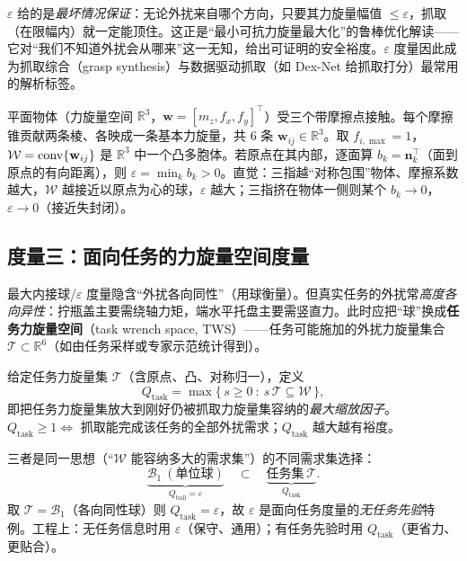 \begin{insight}
$\varepsilon$ 给的是\emph{最坏情况保证}：无论外扰来自哪个方向，只要其力旋量幅值 $\le\varepsilon$，抓取（在限幅内）就一定能顶住。这正是“最小可抗力旋量最大化”的鲁棒优化解读——它对“我们不知道外扰会从哪来”这一无知，给出可证明的安全裕度。$\varepsilon$ 度量因此成为抓取综合（grasp synthesis）与数据驱动抓取（如 Dex-Net 给抓取打分）最常用的解析标签。
\end{insight}

\begin{example}\label{ex:gp-epsilon-2d}
平面物体（力旋量空间 $\mathbb{R}^3$，$\mathbf{w}=[m_z,f_x,f_y]^\top$）受三个带摩擦点接触。每个摩擦锥贡献两条棱、各映成一条基本力旋量，共 $6$ 条 $\mathbf{w}_{ij}\in\mathbb{R}^3$。取 $f_{i,\max}=1$，$\mathcal{W}=\operatorname{conv}\{\mathbf{w}_{ij}\}$ 是 $\mathbb{R}^3$ 中一个凸多胞体。若原点在其内部，逐面算 $b_k=\mathbf{n}_k^\top$（面到原点的有向距离），则 $\varepsilon=\min_k b_k>0$。直觉：三指越“对称包围”物体、摩擦系数越大，$\mathcal{W}$ 越接近以原点为心的球，$\varepsilon$ 越大；三指挤在物体一侧则某个 $b_k\to 0$，$\varepsilon\to 0$（接近失封闭）。
\end{example}

\subsection{度量三：面向任务的力旋量空间度量}
最大内接球/$\varepsilon$ 度量隐含“外扰各向同性”（用球衡量）。但真实任务的外扰常\emph{高度各向异性}：拧瓶盖主要需绕轴力矩，端水平托盘主要需竖直力。此时应把“球”换成\textbf{任务力旋量空间}（task wrench space, TWS）——任务可能施加的外扰力旋量集合 $\mathcal{T}\subset\mathbb{R}^6$（如由任务采样或专家示范统计得到）。

\begin{definition}[面向任务的抓取度量]\label{def:gp-task}
给定任务力旋量集 $\mathcal{T}$（含原点、凸、对称归一），定义
\begin{equation}
  Q_{\text{task}}=\max\{\,s\ge 0\ :\ s\,\mathcal{T}\subseteq\mathcal{W}\,\},
  \label{eq:gp-task}
\end{equation}
即把任务力旋量集放大到刚好仍被抓取力旋量集容纳的\emph{最大缩放因子}。$Q_{\text{task}}\ge 1\iff$ 抓取能完成该任务的全部外扰需求；$Q_{\text{task}}$ 越大越有裕度。
\end{definition}

\begin{note}[三个度量的统一与退化]
三者是同一思想（“$\mathcal{W}$ 能容纳多大的需求集”）的不同需求集选择：
\[
\underbrace{\mathcal{B}_1\ (\text{单位球})}_{Q_{\text{ball}}=\varepsilon}\quad\subset\quad\underbrace{\text{任务集}\ \mathcal{T}}_{Q_{\text{task}}}.
\]
取 $\mathcal{T}=\mathcal{B}_1$（各向同性球）则 $Q_{\text{task}}=\varepsilon$，故 $\varepsilon$ 是面向任务度量的\emph{无任务先验}特例。工程上：无任务信息时用 $\varepsilon$（保守、通用）；有任务先验时用 $Q_{\text{task}}$（更省力、更贴合）。
\end{note}

